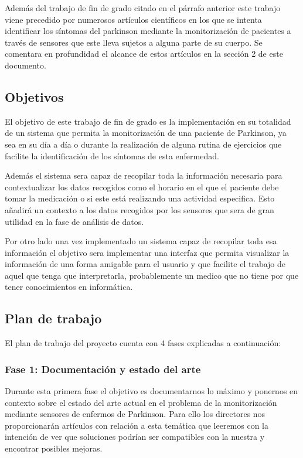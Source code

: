 \documentclass[11pt,spanish]{article}
\begin{document}
Además del trabajo de fin de grado citado en el párrafo anterior este trabajo viene precedido por numerosos artículos científicos en los que se intenta identificar los síntomas del parkinson mediante la monitorización de pacientes a través de sensores que este lleva sujetos a alguna parte de su cuerpo. Se comentara en profundidad el alcance de estos artículos en la sección 2 de este documento.

\subsection{Objetivos}

El objetivo de este trabajo de fin de grado es la implementación en su totalidad de un sistema que permita la monitorización de una paciente de Parkinson, ya sea en su día a día o durante la realización de alguna rutina de ejercicios que facilite la identificación de los síntomas de esta enfermedad. 
\newline

Además el sistema sera capaz de recopilar toda la información necesaria para contextualizar los datos recogidos como el horario en el que el paciente debe tomar la medicación o si este está realizando una actividad especifica. Esto añadirá un contexto a los datos recogidos por los sensores que sera de gran utilidad en la fase de análisis de datos.
\newline

Por otro lado una vez implementado un sistema capaz de recopilar toda esa información el objetivo sera implementar una interfaz que permita visualizar la información de una forma amigable para el usuario y que facilite el trabajo de aquel que tenga que interpretarla, probablemente un medico que no tiene por que tener conocimientos en informática.
\newline

\subsection{Plan de trabajo}
El plan de trabajo del proyecto cuenta con 4 fases explicadas a continuación:

\subsubsection{Fase 1: Documentación y estado del arte}
Durante esta primera fase el objetivo es documentarnos lo máximo y ponernos en contexto sobre el estado del arte actual en el problema de la monitorización mediante sensores de enfermos de Parkinson. Para ello los directores nos proporcionarán artículos con relación a esta temática que leeremos con la intención de ver que soluciones podrían ser compatibles con la nuestra y encontrar posibles mejoras.
\end{document}
